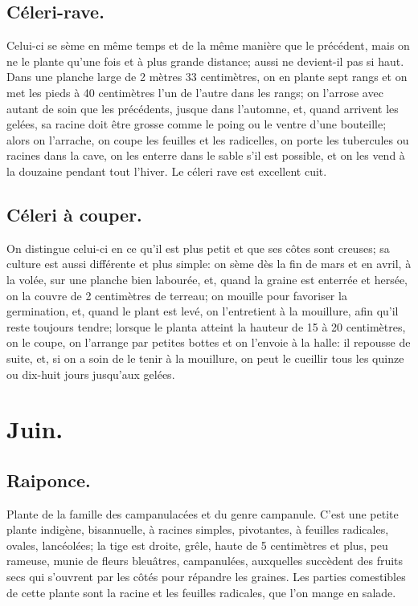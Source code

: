 \documentclass[10pt,a4paper]{book}
\begin{document}
\subsection{Céleri-rave.}

Celui-ci se sème en même temps et de la même manière que le précédent, mais on ne le plante qu'une fois et à plus grande distance; aussi ne devient-il pas si haut. Dans une planche large de 2 mètres 33 centimètres, on en plante sept rangs et on met les pieds à 40 centimètres l'un de l'autre dans les rangs; on l'arrose avec autant de soin que les précédents, jusque dans l'automne, et, quand arrivent les gelées, sa racine doit être grosse comme le poing ou le ventre d'une bouteille; alors on l'arrache, on coupe les feuilles et les radicelles, on porte les tubercules ou racines dans la cave, on les enterre dans le sable s'il est possible, et on les vend à la douzaine pendant tout l'hiver. Le céleri rave est excellent cuit.

\subsection{Céleri à couper.}

On distingue celui-ci en ce qu'il est plus petit et que ses côtes sont creuses; sa culture est aussi différente et plus simple: on sème dès la fin de mars et en avril, à la volée, sur une planche bien labourée, et, quand la graine est enterrée et hersée, on la couvre de 2 centimètres de terreau; on mouille pour favoriser la germination, et, quand le plant est levé, on l'entretient à la mouillure, afin qu'il reste toujours tendre; lorsque le planta atteint la hauteur de 15 à 20 centimètres, on le coupe, on l'arrange par petites bottes et on l'envoie à la halle: il repousse de suite, et, si on a soin de le tenir à la mouillure, on peut le cueillir tous les quinze ou dix-huit jours jusqu'aux gelées.

\section{Juin.}

\subsection{Raiponce.}

Plante de la famille des campanulacées et du genre campanule. C'est une petite plante indigène, bisannuelle, à racines simples, pivotantes, à feuilles radicales, ovales, lancéolées; la tige est droite, grêle, haute de 5 centimètres et plus, peu rameuse, munie de fleurs bleuâtres, campanulées, auxquelles succèdent des fruits secs qui s'ouvrent par les côtés pour répandre les graines. Les parties comestibles de cette plante sont la racine et les feuilles radicales, que l'on mange en salade.
\end{document}

